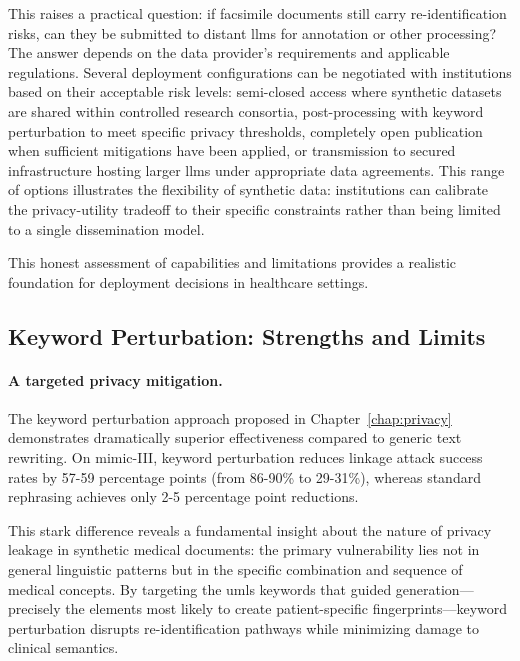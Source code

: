 This raises a practical question: if facsimile documents still carry re-identification risks, can they be submitted to distant \glspl{llm} for annotation or other processing?
The answer depends on the data provider's requirements and applicable regulations.
Several deployment configurations can be negotiated with institutions based on their acceptable risk levels: semi-closed access where synthetic datasets are shared within controlled research consortia, post-processing with keyword perturbation to meet specific privacy thresholds, completely open publication when sufficient mitigations have been applied, or transmission to secured infrastructure hosting larger \glspl{llm} under appropriate data agreements.
This range of options illustrates the flexibility of synthetic data: institutions can calibrate the privacy-utility tradeoff to their specific constraints rather than being limited to a single dissemination model.

This honest assessment of capabilities and limitations provides a realistic foundation for deployment decisions in healthcare settings.

\subsection{Keyword Perturbation: Strengths and Limits}

\paragraph{A targeted privacy mitigation.}

The keyword perturbation approach proposed in Chapter~\ref{chap:privacy} demonstrates dramatically superior effectiveness compared to generic text rewriting.
On \gls{mimic}-III, keyword perturbation reduces linkage attack success rates by 57-59 percentage points (from 86-90\% to 29-31\%), whereas standard rephrasing achieves only 2-5 percentage point reductions.

This stark difference reveals a fundamental insight about the nature of privacy leakage in synthetic medical documents: the primary vulnerability lies not in general linguistic patterns but in the specific combination and sequence of medical concepts.
By targeting the \gls{umls} keywords that guided generation—precisely the elements most likely to create patient-specific fingerprints—keyword perturbation disrupts re-identification pathways while minimizing damage to clinical semantics.

